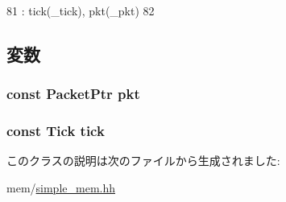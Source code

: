 \begin{DoxyCode}
81                                                    : tick(_tick), pkt(_pkt)
82         { }
\end{DoxyCode}


\subsection{変数}
\hypertarget{classSimpleMemory_1_1DeferredPacket_a6fb971eb547deb70a1eb9fc09047e9ae}{
\subsubsection[{pkt}]{\setlength{\rightskip}{0pt plus 5cm}const {\bf PacketPtr} {\bf pkt}}}
\label{classSimpleMemory_1_1DeferredPacket_a6fb971eb547deb70a1eb9fc09047e9ae}
\hypertarget{classSimpleMemory_1_1DeferredPacket_a018b1d349ea79fddf1472935835a1d96}{
\subsubsection[{tick}]{\setlength{\rightskip}{0pt plus 5cm}const {\bf Tick} {\bf tick}}}
\label{classSimpleMemory_1_1DeferredPacket_a018b1d349ea79fddf1472935835a1d96}


このクラスの説明は次のファイルから生成されました:\begin{DoxyCompactItemize}
\item 
mem/\hyperlink{simple__mem_8hh}{simple\_\-mem.hh}\end{DoxyCompactItemize}
